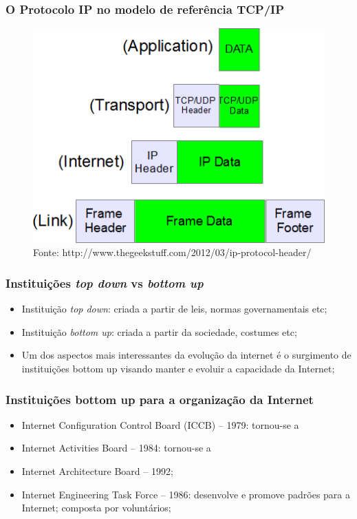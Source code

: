 \documentclass{beamer}
\begin{document}

\begin{frame}
\frametitle{O Protocolo IP no modelo de referência TCP/IP}
\begin{figure}
\includegraphics[width=0.6\linewidth]{ip-header-1.png}
\caption{Fonte: http://www.thegeekstuff.com/2012/03/ip-protocol-header/}
\end{figure}
\end{frame}


\begin{frame}
\frametitle{Instituições \emph{top down} vs \emph{bottom up}}
\begin{itemize}
\item Instituição \emph{top down}: criada a partir de leis, normas governamentais etc;
\item Instituição \emph{bottom up}: criada a partir da sociedade, costumes etc;
\item Um dos aspectos mais interessantes da evolução da internet é o surgimento de instituições bottom up visando manter e evoluir a capacidade da Internet;
\end{itemize}
\end{frame}

\begin{frame}
\frametitle{Instituições bottom up para a organização da Internet}
\begin{itemize}
\item Internet Configuration Control Board (ICCB) -- 1979: tornou-se a
\item Internet Activities Board -- 1984: tornou-se a
\item Internet Architecture Board -- 1992;
\item Internet Engineering Task Force -- 1986: desenvolve e promove padrões para a Internet; composta por voluntários;
\end{itemize}
\end{frame}
\end{document}
